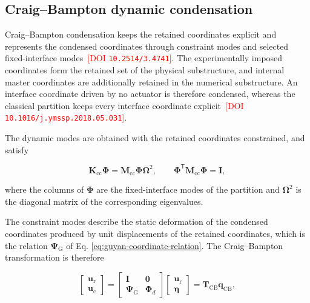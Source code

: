 \documentclass[a4paper,fleqn,review,12pt]{cas-sc}
\numberwithin{equation}{section}
\newcommand{\rev}[1]{\textcolor{red}{#1}}
\begin{document}
\subsection{Craig--Bampton dynamic condensation}
\label{sec:cb-condensation}

Craig--Bampton condensation keeps the retained coordinates explicit and represents the condensed coordinates through constraint modes and selected fixed-interface modes \cite{CraigBampton1968}\,\rev{[DOI \nolinkurl{10.2514/3.4741}]}. The experimentally imposed coordinates form the retained set of the physical substructure, and internal master coordinates are additionally retained in the numerical substructure. An interface coordinate driven by no actuator is therefore condensed, whereas the classical partition keeps every interface coordinate explicit \cite{Krattiger2019}\,\rev{[DOI \nolinkurl{10.1016/j.ymssp.2018.05.031}]}.

The dynamic modes are obtained with the retained coordinates constrained, and satisfy

\vspace{-3.5em}
\begin{equation}
	\mathbf{K}_{\mathrm{cc}}\bm{\Phi}
	=\mathbf{M}_{\mathrm{cc}}\bm{\Phi}\bm{\Omega}^{2},
	\qquad
	\bm{\Phi}^{\mathsf{T}}\mathbf{M}_{\mathrm{cc}}\bm{\Phi}=\mathbf{I},
	\label{eq:fixed-interface-modes}
\end{equation}
\vspace{-3.5em}

\noindent where the columns of \(\bm{\Phi}\) are the fixed-interface modes of the partition and \(\bm{\Omega}^{2}\) is the diagonal matrix of the corresponding eigenvalues.

The constraint modes describe the static deformation of the condensed coordinates produced by unit displacements of the retained coordinates, which is the relation \(\bm{\Psi}_{\mathrm{G}}\) of Eq. \eqref{eq:guyan-coordinate-relation}. The Craig--Bampton transformation is therefore

\vspace{-3.5em}
\begin{equation}
	\begin{bmatrix}
		\bm{u}_{\mathrm{r}}\\
		\bm{u}_{\mathrm{c}}
	\end{bmatrix}
	=
	\begin{bmatrix}
		\mathbf{I} & \mathbf{0}\\
		\bm{\Psi}_{\mathrm{G}} & \bm{\Phi}_{d}
	\end{bmatrix}
	\begin{bmatrix}
		\bm{u}_{\mathrm{r}}\\
		\bm{\eta}
	\end{bmatrix}
	=
	\mathbf{T}_{\mathrm{CB}}\bm{q}_{\mathrm{CB}},
	\label{eq:cb-transformation}
\end{equation}
\vspace{-3.5em}
\end{document}
